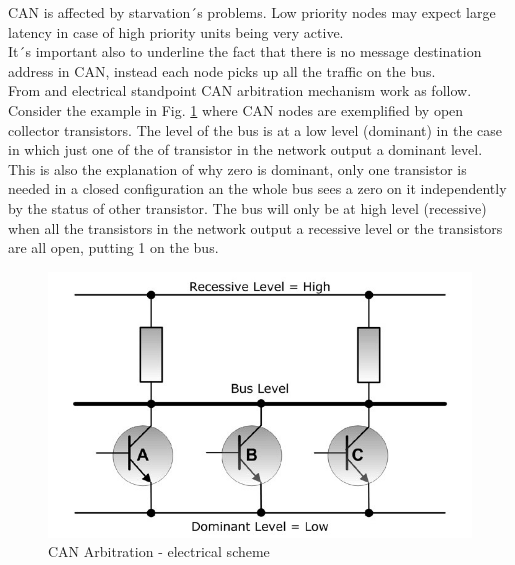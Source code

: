 \documentclass[../main.tex]{subfiles}
\begin{document}
\gls{CAN} is affected by starvation´s problems. Low priority nodes may expect large latency in case of high priority units being very active. \\
It´s important also to underline the fact that there is no message destination address in \gls{CAN}, instead each node picks up all the traffic on the bus.\\
From and electrical standpoint \gls{CAN} arbitration mechanism work as follow. Consider the example in Fig. \ref{fig:CANABRELT} where \gls{CAN} nodes are exemplified by open collector transistors. 
The level of the bus is at a low level (dominant) in the case in which just one of the of transistor in the network output a dominant level. This is also the explanation of why zero is dominant, only one transistor is needed in a closed configuration an the whole bus sees a zero on it independently by the status of other transistor. The bus will only be at high level (recessive) when all the transistors in the network output a recessive level or the transistors are all open, putting 1 on the \gls{bus}.
\begin{figure}[ht]
    \centering
    \includegraphics[width=0.7\linewidth]{images_folder/controller-area-network-can-bus-bus-arbitration-3.jpg}
    \caption{CAN Arbitration -  electrical scheme}
    \label{fig:CANABRELT}
\end{figure}
\end{document}
